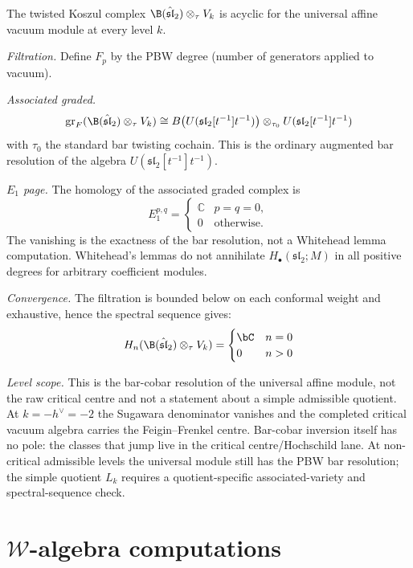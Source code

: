 \begin{computation}\label{comp:km-acyclic}
The twisted Koszul complex $\B(\hat{\mathfrak{sl}}_2) \otimes_\tau V_k$
is acyclic for the universal affine vacuum module at every level $k$.

\emph{Filtration.} Define $F_p$ by the PBW degree (number of generators applied to vacuum).

\emph{Associated graded.}
\[
\mathrm{gr}_F(\B(\hat{\mathfrak{sl}}_2) \otimes_\tau V_k) \cong
B\bigl(U(\mathfrak{sl}_2[t^{-1}]t^{-1})\bigr)
\otimes_{\tau_0} U(\mathfrak{sl}_2[t^{-1}]t^{-1})
\]
with $\tau_0$ the standard bar twisting cochain. This is the ordinary
augmented bar resolution of the algebra
$U(\mathfrak{sl}_2[t^{-1}]t^{-1})$.

\emph{$E_1$ page.} The homology of the associated graded complex is
\[
E_1^{p,q} =
\begin{cases}
\mathbb{C} & p=q=0,\\
0 & \text{otherwise}.
\end{cases}
\]
The vanishing is the exactness of the bar resolution, not a Whitehead
lemma computation. Whitehead's lemmas do not annihilate
$H_\bullet(\mathfrak{sl}_2;M)$ in all positive degrees for arbitrary
coefficient modules.

\emph{Convergence.} The filtration is bounded below on each conformal
weight and exhaustive, hence the spectral sequence gives:
\[
H_n(\B(\hat{\mathfrak{sl}}_2) \otimes_\tau V_k) = \begin{cases}
\bC & n = 0 \\
0 & n > 0
\end{cases}
\]

\emph{Level scope.} This is the bar-cobar resolution of the universal
affine module, not the raw critical centre and not a statement about a
simple admissible quotient. At $k=-h^\vee=-2$ the Sugawara denominator
vanishes and the completed critical vacuum algebra carries the
Feigin--Frenkel centre. Bar-cobar inversion itself has no pole: the
classes that jump live in the critical centre/Hochschild lane. At
non-critical admissible levels the universal module still has the PBW
bar resolution; the simple quotient $L_k$ requires a quotient-specific
associated-variety and spectral-sequence check.
\end{computation}


\section{$\mathcal{W}$-algebra computations}

